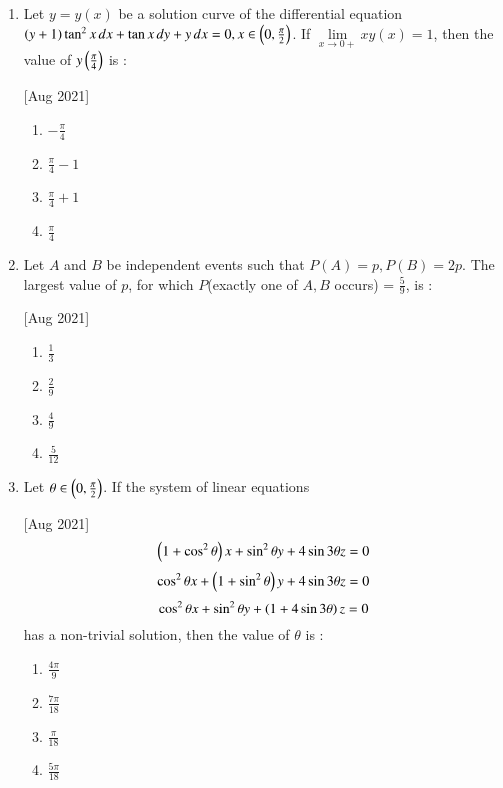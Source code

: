 \documentclass[journal,12pt,twocolumn]{IEEEtran}
\theoremstyle{remark}
\begin{document}
\begin{enumerate}
    \hfill[Aug 2021]
        \begin{enumerate}
            \item $6$
            \item $12$
            \item $14$
            \item $24$
        \end{enumerate}

    \item Let $y=y(x)$ be a solution curve of the differential equation $(y+1)\tan^2{x}\,dx + \tan{x}\,dy + y\,dx=0, x\in\left(0,\frac{\pi}{2}\right)$. If $\lim\limits_{x\to0+}xy(x)=1$, then the value of $y\left(\frac{\pi}{4}\right)$ is :
    
    \hfill[Aug 2021]
        \begin{enumerate}
            \item $-\frac{\pi}{4}$
            \item $\frac{\pi}{4}-1$
            \item $\frac{\pi}{4}+1$
            \item $\frac{\pi}{4}$
        \end{enumerate}

    \item Let $A$ and $B$ be independent events such that $P(A) = p, P(B) = 2p$. The largest value of $p$, for which $P$(exactly one of $A, B$ occurs) = $\frac{5}{9}$, is :
    
    \hfill[Aug 2021]
        \begin{enumerate}
            \item $\frac{1}{3}$
            \item $\frac{2}{9}$
            \item $\frac{4}{9}$
            \item $\frac{5}{12}$
        \end{enumerate}

    \item Let $\theta\in\left(0,\frac{\pi}{2}\right)$. If the system of linear equations
    
    \hfill[Aug 2021]
            $$\left(1+\cos^2{\theta}\right)x+\sin^2{\theta}y+4\sin{3\theta}z=0$$
            $$\cos^2{\theta}x+\left(1+\sin^2{\theta}\right)y+4\sin{3\theta}z=0$$
            $$\cos^2{\theta}x+\sin^2{\theta}y+\left(1+4\sin{3\theta}\right)z=0$$
        has a non-trivial solution, then the value of $\theta$ is :
        \begin{enumerate}
            \item $\frac{4\pi}{9}$
            \item $\frac{7\pi}{18}$
            \item $\frac{\pi}{18}$
            \item $\frac{5\pi}{18}$
        \end{enumerate}


\end{enumerate}
\end{document}
